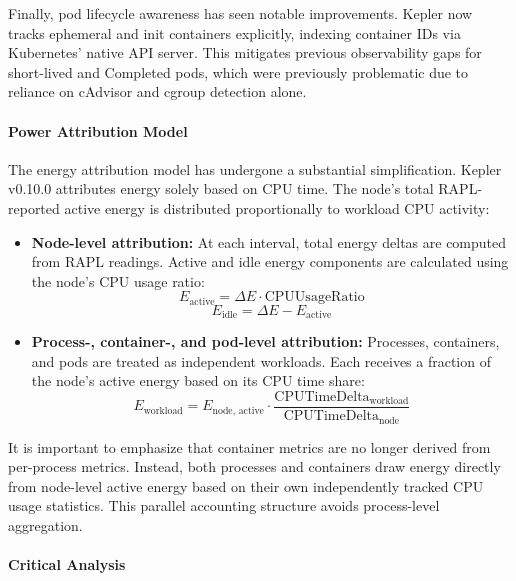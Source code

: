Finally, pod lifecycle awareness has seen notable improvements. Kepler now tracks ephemeral and init containers explicitly, indexing container IDs via Kubernetes' native API server. This mitigates previous observability gaps for short-lived and Completed pods, which were previously problematic due to reliance on cAdvisor and cgroup detection alone.

\paragraph{Power Attribution Model}

The energy attribution model has undergone a substantial simplification. Kepler v0.10.0 attributes energy solely based on CPU time. The node's total RAPL-reported active energy is distributed proportionally to workload CPU activity:

\begin{itemize}
    \item \textbf{Node-level attribution:} At each interval, total energy deltas are computed from RAPL readings. Active and idle energy components are calculated using the node's CPU usage ratio:
    \begin{equation}
        E_{\text{active}} = \Delta E \cdot \text{CPUUsageRatio}
    \end{equation}
    \begin{equation}
        E_{\text{idle}} = \Delta E - E_{\text{active}}
    \end{equation}

    \item \textbf{Process-, container-, and pod-level attribution:} Processes, containers, and pods are treated as independent workloads. Each receives a fraction of the node's active energy based on its CPU time share:
    \begin{equation}
        E_{\text{workload}} = E_{\text{node, active}} \cdot \frac{\text{CPUTimeDelta}_{\text{workload}}}{\text{CPUTimeDelta}_{\text{node}}}
    \end{equation}
\end{itemize}

It is important to emphasize that container metrics are no longer derived from per-process metrics. Instead, both processes and containers draw energy directly from node-level active energy based on their own independently tracked CPU usage statistics. This parallel accounting structure avoids process-level aggregation.

\paragraph{Critical Analysis}

